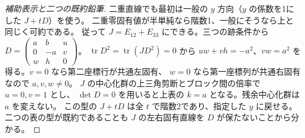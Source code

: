 \begin{proof}[補助表示と二つの既約鉛筆]
二重直線でも最初は一般の $y$ 方向（$y$ の係数を1にした $J+tD$）を使う。
二重零固有値が半単純なら階数1、一般にそうなら上と同じく可約である。
従って $J=E_{12}+E_{33}$ にできる。三つの跡条件から
$D=\left(\begin{smallmatrix}a&b&u\\0&-a&v\\w&h&0\end{smallmatrix}\right)$。
$\operatorname{tr}D^2=\operatorname{tr}(JD^2)=0$ から
$uw+vh=-a^2$、$vw=a^2$ を得る。$v=0$ なら第二座標行が共通左固有、
$w=0$ なら第一座標列が共通右固有なので $a,v,w\ne0$。
$J$ の中心化群の上三角剪断とブロック間の倍率で $u=0,v=1$ とし、
$\det D=0$ を用いると上表の $k=a$ となる。残余中心化群は $a$ を変えない。
この型の $J+tD$ は全 $t$ で階数2であり、指定した $y$ に戻せる。
二つの表の型が既約であることも $J$ の左右固有直線を $D$ が保たないことから分かる。
\end{proof}

